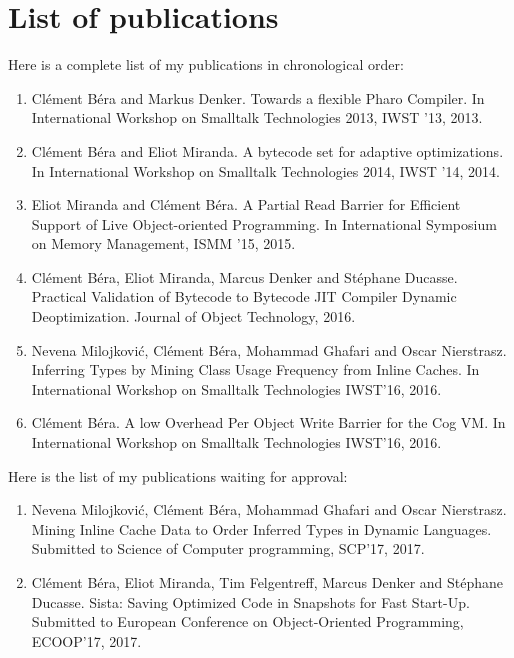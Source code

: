 \documentclass[a4paper,12pt,twoside]{../includes/ThesisStyle}
\begin{document}
\fi

\chapter{List of publications}
\label{appendix:pubs}
\minitoc

Here is a complete list of my publications in chronological order:

\begin{enumerate}
	\item Cl\'ement B\'era and Markus Denker. Towards a flexible Pharo Compiler. In International Workshop on Smalltalk Technologies 2013, IWST '13, 2013.
	\item Cl\'ement B\'era and Eliot Miranda. A bytecode set for adaptive optimizations. In International Workshop on Smalltalk Technologies 2014, IWST '14, 2014.
	\item Eliot Miranda and Cl\'ement B\'era. A Partial Read Barrier for Efficient Support of Live Object-oriented Programming. In International Symposium on Memory Management, ISMM '15, 2015.
	\item Cl\'ement B\'era, Eliot Miranda, Marcus Denker and St\'ephane Ducasse. Practical Validation of Bytecode to Bytecode JIT Compiler Dynamic Deoptimization. Journal of Object Technology, 2016.
	\item Nevena Milojkovi\'c, Cl\'ement B\'era, Mohammad Ghafari and Oscar Nierstrasz. Inferring Types by Mining Class Usage Frequency from Inline Caches. In International Workshop on Smalltalk Technologies IWST'16, 2016.
	\item Cl\'ement B\'era. A low Overhead Per Object Write Barrier for the Cog VM. In International Workshop on Smalltalk Technologies IWST'16, 2016.
\end{enumerate}

Here is the list of my publications waiting for approval:

\begin{enumerate}
	\item Nevena Milojkovi\'c, Cl\'ement B\'era, Mohammad Ghafari and Oscar Nierstrasz. Mining Inline Cache Data to Order Inferred Types in Dynamic Languages. Submitted to Science of Computer programming, SCP'17, 2017.
	\item Cl\'ement B\'era, Eliot Miranda, Tim Felgentreff, Marcus Denker and St\'ephane Ducasse. Sista: Saving Optimized Code in Snapshots for Fast Start-Up. Submitted to European Conference on Object-Oriented Programming, ECOOP'17, 2017.
\end{enumerate}

\ifx\wholebook\relax\else
    
\end{document}
